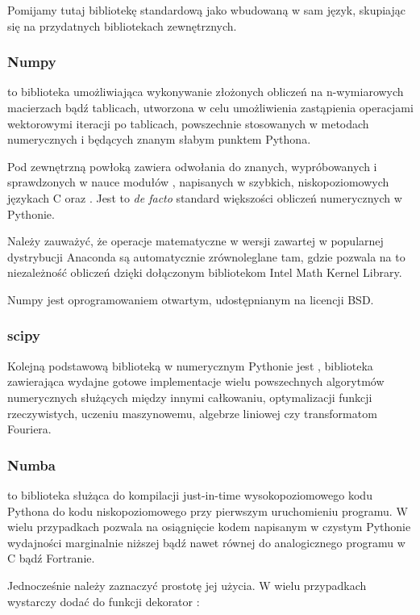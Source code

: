 Pomijamy tutaj bibliotekę standardową jako wbudowaną w sam język, skupiając się na przydatnych bibliotekach zewnętrznych.

\subsubsection{Numpy}
\cite{numpy} to biblioteka umożliwiająca wykonywanie złożonych obliczeń na
n-wymiarowych macierzach bądź tablicach, utworzona w celu umożliwienia
zastąpienia operacjami wektorowymi iteracji po tablicach, powszechnie
stosowanych w metodach numerycznych i będących znanym słabym punktem
Pythona.

Pod zewnętrzną powłoką zawiera odwołania do znanych, wypróbowanych i
sprawdzonych w nauce modułów ,  napisanych w
szybkich, niskopoziomowych językach C oraz .  Jest to
\emph{de facto} standard większości obliczeń numerycznych w Pythonie.

Należy zauważyć, że operacje matematyczne w wersji  zawartej
w popularnej dystrybucji Anaconda są automatycznie zrównoleglane tam, gdzie
pozwala na to niezależność obliczeń dzięki dołączonym bibliotekom Intel Math
Kernel Library.\cite{intel-mkl} 

Numpy jest oprogramowaniem otwartym, udostępnianym na licencji BSD.


\subsubsection{scipy}
Kolejną podstawową biblioteką w numerycznym Pythonie jest \cite{scipy},
biblioteka zawierająca wydajne gotowe implementacje wielu powszechnych algorytmów
numerycznych służących między innymi całkowaniu, optymalizacji funkcji rzeczywistych,
uczeniu maszynowemu, algebrze liniowej czy transformatom Fouriera.

\subsubsection{Numba}
 to biblioteka służąca do kompilacji just-in-time wysokopoziomowego
kodu Pythona do kodu niskopoziomowego przy pierwszym uruchomieniu programu. W
wielu przypadkach pozwala na osiągnięcie kodem napisanym w czystym Pythonie
wydajności marginalnie niższej bądź nawet równej do analogicznego programu w C
bądź Fortranie. \cite{numba}

Jednocześnie należy zaznaczyć prostotę jej użycia. W wielu przypadkach wystarczy
dodać do funkcji dekorator :

